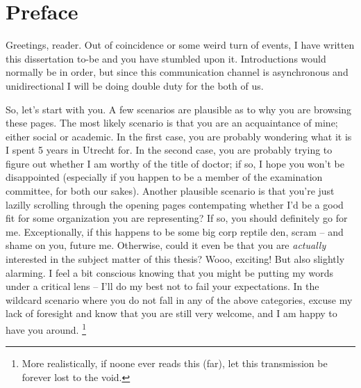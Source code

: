 {
\renewcommand{\thechapter}{\arabic{chapter}}
\setcounter{chapter}{-1}
\renewcommand{\bibname}{Papers this dissertation is based on}
\chapter{Preface}
\label{chapter:preface}

Greetings, reader. Out of coincidence or some weird turn of events, I have written this dissertation to-be and you have stumbled upon it.
Introductions would normally be in order, but since this communication channel is asynchronous and unidirectional I will be doing double duty for the both of us.

So, let's start with you. 
A few scenarios are plausible as to why you are browsing these pages. 
The most likely scenario is that you are an acquaintance of mine; either social or academic.
In the first case, you are probably wondering what it is I spent 5 years in Utrecht for.
In the second case, you are probably trying to figure out whether I am worthy of the title of doctor; if so, I hope you won’t be disappointed (especially if you happen to be a member of the examination committee, for both our sakes).
Another plausible scenario is that you're just lazilly scrolling through the opening pages contempating whether I'd be a good fit for some organization you are representing?
If so, you should definitely go for me.
Exceptionally, if this happens to be some big corp reptile den, scram -- and shame on you, future me.
Otherwise, could it even be that you are \textit{actually} interested in the subject matter of this thesis? 
Wooo, exciting!
But also slightly alarming.
I feel a bit conscious knowing that you might be putting my words under a critical lens – I’ll do my best not to fail your expectations. 
In the wildcard scenario where you do not fall in any of the above categories, excuse my lack of foresight and know that you are still very welcome, and I am happy to have you around.%
\footnote{More realistically, if noone ever reads this (far), let this transmission be forever lost to the void.}

}
